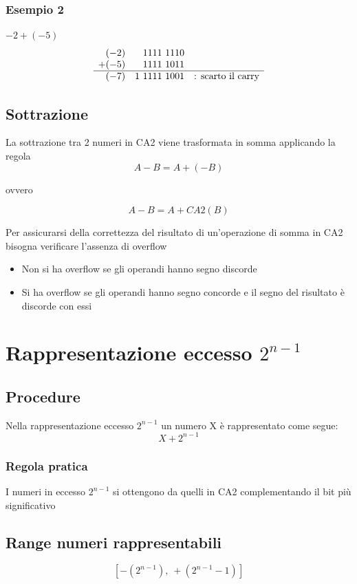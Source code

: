 \subsubsection{Esempio 2}
 $-2 + (-5)$
\[
\begin{array}{r@{\quad}c@{\quad}l}
  (-2) & \phantom{1\ }1111\ 1110 & \\
+ (-5) & \phantom{1\ }1111\ 1011 & \\
\hline
  (-7) & 1\ 1111\ 1001 & \text{: scarto il carry}
\end{array}
\]

\subsection{Sottrazione}
La sottrazione tra 2 numeri in CA2 viene trasformata in somma applicando la regola
{
    \LARGE
    $$
    A - B = A +(-B)
    $$
}
\begin{center}
    \LARGE
    ovvero
\end{center}
{
    \LARGE
    $$
    A - B = A +CA2(B)
    $$
}

Per assicurarsi della correttezza del risultato di un'operazione di somma in CA2 bisogna verificare l'assenza di overflow
\begin{itemize}
    \item Non si ha overflow se gli operandi hanno segno discorde
    \item Si ha overflow se gli operandi hanno segno concorde e il segno del risultato è discorde con essi
\end{itemize}

\newpage
\section{Rappresentazione eccesso $2^{n-1}$}
\subsection{Procedure}
Nella rappresentazione eccesso $2^{n-1}$ un numero X è rappresentato come segue:
$$
    X + 2^{n-1}
$$

\subsubsection{Regola pratica}
I numeri in eccesso $2^{n-1}$ si ottengono da quelli in CA2 complementando il bit più significativo

\subsection{Range numeri rappresentabili}
{\LARGE
    $$
    [-(2^{n-1}),\ +(2^{n-1}-1)]
    $$
}


